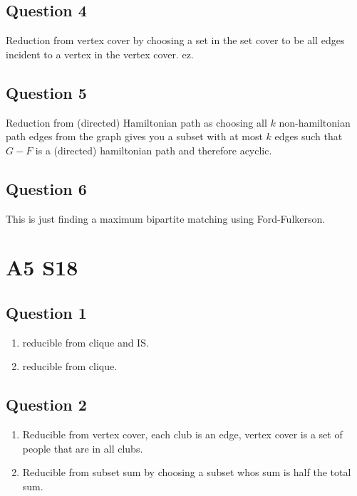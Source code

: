 \documentclass[11pt]{article}
\begin{document}
\subsection{Question 4}

Reduction from vertex cover by choosing a set in the set cover to be all edges incident to a vertex in the vertex cover. ez.

\subsection{Question 5}

Reduction from (directed) Hamiltonian path as choosing all $k$ non-hamiltonian path edges from the graph gives you a subset with at most $k$ edges such that $G - F$ is a (directed) hamiltonian path and therefore acyclic.

\subsection{Question 6}

This is just finding a maximum bipartite matching using Ford-Fulkerson.

\section{A5 S18}

\subsection{Question 1}

\begin{enumerate}
    \item reducible from clique and IS.
    \item reducible from clique.
\end{enumerate}

\subsection{Question 2}

\begin{enumerate}
    \item Reducible from vertex cover, each club is an edge, vertex cover is a set of people that are in all clubs.
    \item Reducible from subset sum by choosing a subset whos sum is half the total sum.
\end{enumerate}
\end{document}
